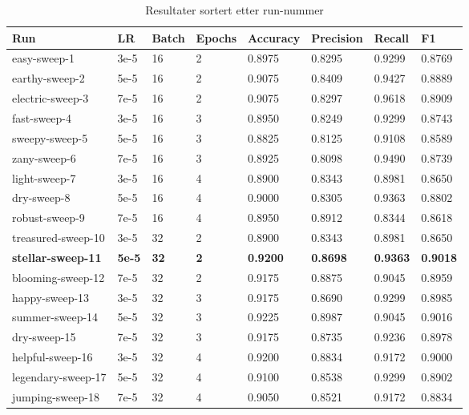 \begin{table}
\caption{Resultater sortert etter run-nummer}
\label{tab:results}
\begin{tabular}{llllllll}
\toprule
Run & LR & Batch & Epochs & Accuracy & Precision & Recall & F1 \\
\midrule
easy-sweep-1 & 3e-5 & 16 & 2 & 0.8975 & 0.8295 & 0.9299 & 0.8769 \\
earthy-sweep-2 & 5e-5 & 16 & 2 & 0.9075 & 0.8409 & 0.9427 & 0.8889 \\
electric-sweep-3 & 7e-5 & 16 & 2 & 0.9075 & 0.8297 & 0.9618 & 0.8909 \\
fast-sweep-4 & 3e-5 & 16 & 3 & 0.8950 & 0.8249 & 0.9299 & 0.8743 \\
sweepy-sweep-5 & 5e-5 & 16 & 3 & 0.8825 & 0.8125 & 0.9108 & 0.8589 \\
zany-sweep-6 & 7e-5 & 16 & 3 & 0.8925 & 0.8098 & 0.9490 & 0.8739 \\
light-sweep-7 & 3e-5 & 16 & 4 & 0.8900 & 0.8343 & 0.8981 & 0.8650 \\
dry-sweep-8 & 5e-5 & 16 & 4 & 0.9000 & 0.8305 & 0.9363 & 0.8802 \\
robust-sweep-9 & 7e-5 & 16 & 4 & 0.8950 & 0.8912 & 0.8344 & 0.8618 \\
treasured-sweep-10 & 3e-5 & 32 & 2 & 0.8900 & 0.8343 & 0.8981 & 0.8650 \\
\textbf{stellar-sweep-11} & \textbf{5e-5} & \textbf{32} & \textbf{2} & \textbf{0.9200} & \textbf{0.8698} & \textbf{0.9363} & \textbf{0.9018} \\
blooming-sweep-12 & 7e-5 & 32 & 2 & 0.9175 & 0.8875 & 0.9045 & 0.8959 \\
happy-sweep-13 & 3e-5 & 32 & 3 & 0.9175 & 0.8690 & 0.9299 & 0.8985 \\
summer-sweep-14 & 5e-5 & 32 & 3 & 0.9225 & 0.8987 & 0.9045 & 0.9016 \\
dry-sweep-15 & 7e-5 & 32 & 3 & 0.9175 & 0.8735 & 0.9236 & 0.8978 \\
helpful-sweep-16 & 3e-5 & 32 & 4 & 0.9200 & 0.8834 & 0.9172 & 0.9000 \\
legendary-sweep-17 & 5e-5 & 32 & 4 & 0.9100 & 0.8538 & 0.9299 & 0.8902 \\
jumping-sweep-18 & 7e-5 & 32 & 4 & 0.9050 & 0.8521 & 0.9172 & 0.8834 \\
\bottomrule
\end{tabular}
\end{table}
